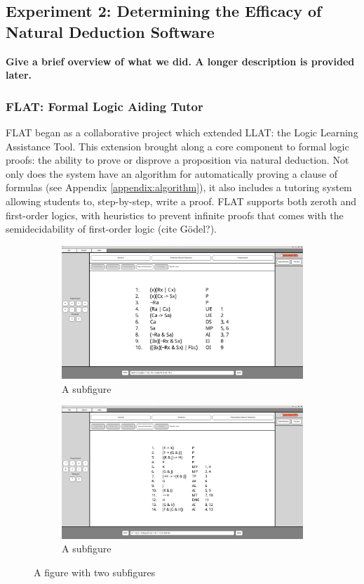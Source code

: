 \documentclass[ms]{uncgdissertationexp2}
\theoremstyle{plain}
\theoremstyle{definition}
\theoremstyle{remark}
\begin{document}
\subsection{Experiment 2: Determining the Efficacy of Natural Deduction Software}
\textbf{Give a brief overview of what we did. A longer description is provided later.}

\subsubsection{FLAT: Formal Logic Aiding Tutor}
FLAT began as a collaborative project which extended LLAT: the Logic Learning Assistance Tool. This extension brought along a core component to formal logic proofs: the ability to prove or disprove a proposition via natural deduction. Not only does the system have an algorithm for automatically proving a clause of formulas (see Appendix \ref{appendix:algorithm}), it also includes a tutoring system allowing students to, step-by-step, write a proof. FLAT supports both zeroth and first-order logics, with heuristics to prevent infinite proofs that comes with the semidecidability of first-order logic (cite G\"odel?).

\begin{figure}[!ht]
	\centering
	\begin{subfigure}{.5\textwidth}
		\centering
        \includegraphics[width=0.9\linewidth]{flat1.png}
		\caption{A subfigure}
		\label{fig:flat1}
	\end{subfigure}%
	\begin{subfigure}{.5\textwidth}
		\centering
		\includegraphics[width=0.9\linewidth]{flat2.png}
		\caption{A subfigure}
		\label{fig:flat2}
	\end{subfigure}
	\caption{A figure with two subfigures}
	\label{fig:flatfigures}
\end{figure}
\end{document}
